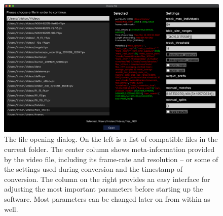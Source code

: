 \documentclass[9pt,lineno]{elife}
\newcommand{\TRex}{\protect\path{TRex}}
\begin{document}
\begin{figure}
    \centering
   \includegraphics[width=\textwidth]{figures/FigureA2.png}
    \caption{The file opening dialog. On the left is a list of compatible files in the current folder. The center column shows meta-information provided by the video file, including its frame-rate and resolution -- or some of the settings used during conversion and the timestamp of conversion. The column on the right provides an easy interface for adjusting the most important parameters before starting up the software. Most parameters can be changed later on from within \TRex{} as well.}
	\label{fig:file_opening}
\end{figure}
\end{document}
